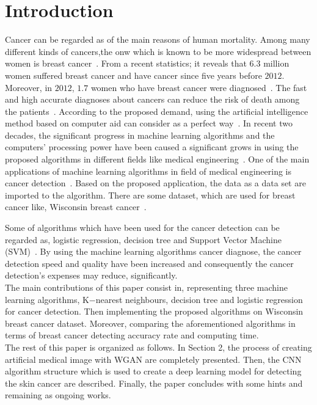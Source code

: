 \documentclass[conference]{IEEEtran}
\begin{document}
\section{Introduction}

Cancer can be regarded as of the main reasons of human mortality. Among many different kinds of cancers,the onw which is known to be more widespread between women is breast cancer~\cite{1}. From a recent statistics; it reveals that $6.3$ million women suffered breast cancer and have cancer since five years before $2012$. Moreover, in $2012$, $1.7$ women who have breast cancer were diagnosed~\cite{2}. The fast and high accurate diagnoses about cancers can reduce the risk of death among the patients~\cite{3}. According to the proposed demand, using the artificial intelligence method based on computer aid can consider as a perfect way~\cite{4}. 
In recent two decades, the significant progress in machine learning algorithms and the computers' processing power have been caused a significant grows in using the proposed algorithms in different fields like medical engineering~\cite{5,6,7}. One of the main applications of machine learning algorithms in field of medical engineering is cancer detection~\cite{8,9,10}. Based on the proposed application, the data as a data set are imported to the algorithm. There are some dataset, which are used for breast cancer like, Wisconsin breast cancer~\cite{11}. 




Some of algorithms which have been used for the cancer detection can be regarded as, logistic regression, decision tree and Support Vector Machine (SVM)~\cite{12, 13}. By using the machine learning algorithms cancer diagnose, the cancer detection speed and quality have been increased and consequently the cancer detection's expenses may reduce, significantly.\\
The main contributions of this paper consist in, representing three machine learning algorithms, K$-$nearest neighbours, decision tree and logistic regression for cancer detection. Then implementing the proposed algorithms on Wisconsin breast cancer dataset. Moreover, comparing the aforementioned algorithms in terms of breast cancer detecting accuracy rate and computing time.\\
The rest of this paper is organized as follows. In Section 2, the process of creating artificial medical image with WGAN are completely presented. Then, the CNN algorithm structure which is used to create a deep learning model for detecting the skin cancer are described. Finally, the paper concludes with some hints and remaining as ongoing works.
\end{document}
